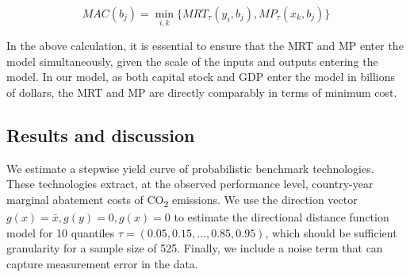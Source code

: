 \documentclass[
  10pt,
]{article}
\begin{document}
\begin{equation}
MAC(b_{j})=\displaystyle \min_{i,k}\{MRT_{\tau}(y_{i},b_{j}), MP_{\tau}(x_{k},b_{j})\} 
\end{equation}

In the above calculation, it is essential to ensure that the MRT and MP
enter the model simultaneously, given the scale of the inputs and
outputs entering the model. In our model, as both capital stock and GDP
enter the model in billions of dollars, the MRT and MP are directly
comparably in terms of minimum cost.

\hypertarget{results-and-discussion}{%
\subsection{Results and discussion}\label{results-and-discussion}}

We estimate a stepwise yield curve of probabilistic benchmark
technologies. These technologies extract, at the observed performance
level, country-year marginal abatement costs of CO\textsubscript{2}
emissions. We use the direction vector \(g(x)=\bar{x}, g(y)=0, g(x)=0\)
to estimate the directional distance function model for 10 quantiles
\(\tau=(0.05,0.15,\dots,0.85,0.95)\), which should be sufficient
granularity for a sample size of 525. Finally, we include a noise term
that can capture measurement error in the data.
\end{document}
